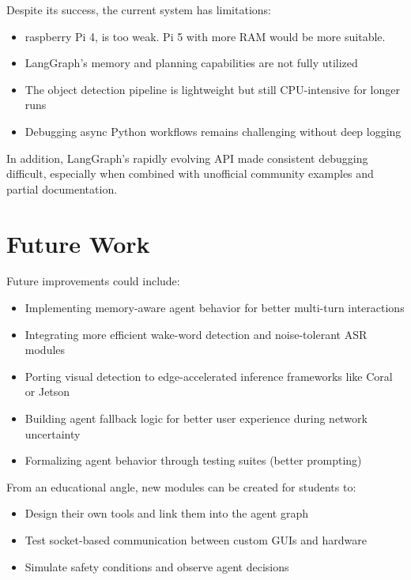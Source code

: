 Despite its success, the current system has limitations:

\begin{itemize}
    \item raspberry Pi 4, is too weak. Pi 5 with more RAM would be more suitable. 
    \item LangGraph’s memory and planning capabilities are not fully utilized
    \item The object detection pipeline is lightweight but still CPU-intensive for longer runs
    \item Debugging async Python workflows remains challenging without deep logging
\end{itemize}

In addition, LangGraph’s rapidly evolving API made consistent debugging difficult, especially when combined with unofficial community examples and partial documentation.

\section{Future Work}

Future improvements could include:

\begin{itemize}
    \item Implementing memory-aware agent behavior for better multi-turn interactions
    \item Integrating more efficient wake-word detection and noise-tolerant ASR modules
    \item Porting visual detection to edge-accelerated inference frameworks like Coral or Jetson
    \item Building agent fallback logic for better user experience during network uncertainty
    \item Formalizing agent behavior through testing suites (better prompting)
\end{itemize}

From an educational angle, new modules can be created for students to:
\begin{itemize}
    \item Design their own tools and link them into the agent graph
    \item Test socket-based communication between custom GUIs and hardware
    \item Simulate safety conditions and observe agent decisions
\end{itemize}

